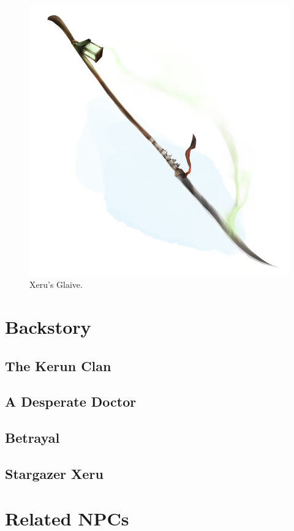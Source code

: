 \documentclass[12pt]{article}
\newif\iffull
\begin{document}
\begin{figure}[H]
  \centering
  \includegraphics[width=.5\textwidth]{./resources/glaive}
  \caption{Xeru's Glaive.}
\end{figure}

\iffull
  \section{Backstory}

  \subsection{The Kerun Clan}

  \subsection{A Desperate Doctor}

  \subsection{Betrayal}
  
  \subsection{Stargazer Xeru}

  \section{Related NPCs}
\end{document}
